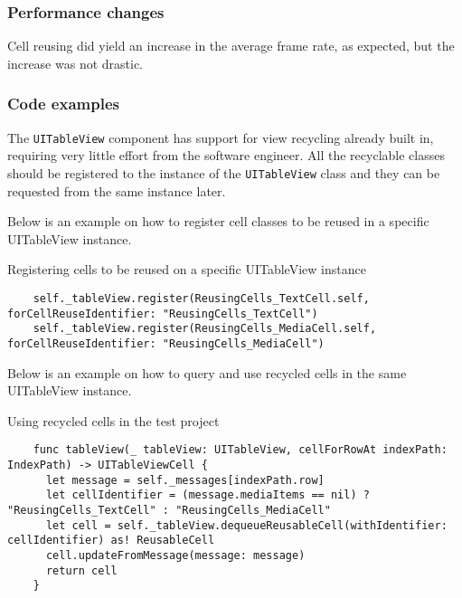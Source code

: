 \documentclass[a4paper,12pt]{article}
\begin{document}
\subsubsection*{Performance changes}
Cell reusing did yield an increase in the average frame rate, as expected, but the increase was not drastic.


\subsubsection*{Code examples}
The \texttt{UITableView} component has support for view recycling already built in, requiring very little effort from the software engineer. All the recyclable classes should be registered to the instance of the \texttt{UITableView} class and they can be requested from the same instance later.

Below is an example on how to register cell classes to be reused in a specific UITableView instance.
\begin{listing}[H]
  \caption{Registering cells to be reused on a specific UITableView instance}
  \begin{verbatim}
    self._tableView.register(ReusingCells_TextCell.self, forCellReuseIdentifier: "ReusingCells_TextCell")
    self._tableView.register(ReusingCells_MediaCell.self, forCellReuseIdentifier: "ReusingCells_MediaCell")
  \end{verbatim}
\end{listing}

Below is an example on how to query and use recycled cells in the same UITableView instance.
\begin{listing}[H]
  \caption{Using recycled cells in the test project}
  \begin{verbatim}
    func tableView(_ tableView: UITableView, cellForRowAt indexPath: IndexPath) -> UITableViewCell {
      let message = self._messages[indexPath.row]
      let cellIdentifier = (message.mediaItems == nil) ? "ReusingCells_TextCell" : "ReusingCells_MediaCell"
      let cell = self._tableView.dequeueReusableCell(withIdentifier: cellIdentifier) as! ReusableCell
      cell.updateFromMessage(message: message)
      return cell
    }
  \end{verbatim}
\end{listing}

\end{document}
